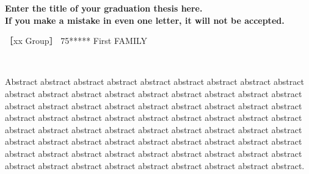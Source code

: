 \documentclass[a4paper,fleqn,12pt]{jreport}
\begin{document}
\begin{center}
{\sffamily\bfseries Enter the title of your graduation thesis here. \\ If you make a mistake in even one letter, it will not be accepted.}
\end{center}

\noindent
［xx Group］ \hfill 75***** First FAMILY

\

Abstract abstract abstract abstract abstract abstract abstract abstract abstract 
abstract abstract abstract abstract abstract abstract abstract abstract abstract
abstract abstract abstract abstract abstract abstract abstract abstract abstract
abstract abstract abstract abstract abstract abstract abstract abstract abstract
abstract abstract abstract abstract abstract abstract abstract abstract abstract
abstract abstract abstract abstract abstract abstract abstract abstract abstract
abstract abstract abstract abstract abstract abstract abstract abstract abstract
abstract abstract abstract abstract abstract abstract abstract abstract abstract.
\end{document}
